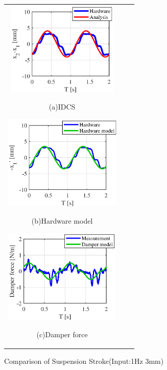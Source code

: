 \documentclass[a4paper,12pt]{article_vdlab_sotsuron}
\begin{document}
\vspace{5mm}
\begin{figure}[h]
  \begin{tabular}{ccc}
  \begin{minipage}{0.33\hsize}
  \begin{center}
    \includegraphics[height=45mm]{figure/hils_nonlinear_sus_3_1.eps}
    \end{center}
    \begin{center}
    \ (a)IDCS\
    \end{center}
  \end{minipage}
  \begin{minipage}{0.33\hsize}
     \begin{center}
      \includegraphics[height=45mm]{figure/hils_nonlinear_idcs_3_1.eps}
      \end{center}
      \begin{center}
      \ (b)Hardware model\
    \end{center}
  \end{minipage}
  \begin{minipage}{0.33\hsize}
  \begin{center}
    \includegraphics[height=45mm]{figure/hils_nonlinear_damper_3_1.eps}
    \end{center}
    \begin{center}
    \ (c)Damper force\
    \end{center}
  \end{minipage}
  \end{tabular}
\vspace*{2mm}
  \caption{Comparison of Suspension Stroke(Input:1Hz 3mm)}
    \label{fig:hils_3_1_nonlinear}
\end{figure}
\end{document}
